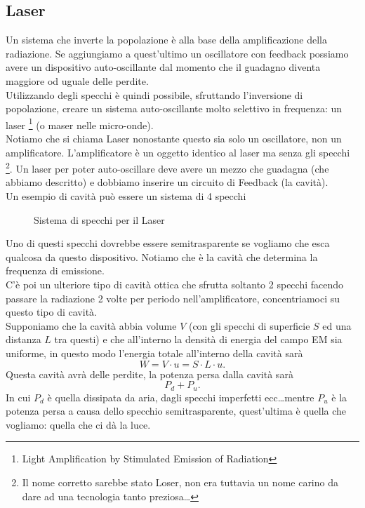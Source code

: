 \subsection{Laser}%
Un sistema che inverte la popolazione è alla base della amplificazione della radiazione. Se aggiungiamo a quest'ultimo un oscillatore con feedback possiamo avere un dispositivo auto-oscillante dal momento che il guadagno diventa maggiore od uguale delle perdite.\\
Utilizzando degli specchi è quindi possibile, sfruttando l'inversione di popolazione, creare un sistema auto-oscillante molto selettivo in frequenza: un laser
\footnote{Light Amplification by Stimulated Emission of Radiation} 
(o maser nelle micro-onde). \\ 
Notiamo che si chiama Laser nonostante questo sia solo un oscillatore, non un amplificatore. L'amplificatore è un oggetto identico al laser ma senza gli specchi
\footnote{Il nome corretto sarebbe stato Loser, non era tuttavia un nome carino da dare ad una tecnologia tanto preziosa\ldots}.
Un laser per poter auto-oscillare deve avere un mezzo che guadagna (che abbiamo descritto) e dobbiamo inserire un circuito di Feedback (la cavità).\\
Un esempio di cavità può essere un sistema di 4 specchi
\begin{figure}[H]
    \centering
    \caption{Sistema di specchi per il Laser}
    \label{fig:sistema-di-specchi-per-il-laser}
\end{figure}
\noindent
Uno di questi specchi dovrebbe essere semitrasparente se vogliamo che esca qualcosa da questo dispositivo. Notiamo che è la cavità che determina la frequenza di emissione.\\
C'è poi un ulteriore tipo di cavità ottica che sfrutta soltanto 2 specchi facendo passare la radiazione 2 volte per periodo nell'amplificatore, concentriamoci su questo tipo di cavità.\\
Supponiamo che la cavità abbia volume $V$ (con gli specchi di superficie $S$ ed una distanza $L$ tra questi)  e che all'interno la densità di energia del campo EM sia uniforme, in questo modo l'energia totale all'interno della cavità sarà
\[
W = V\cdot u = S\cdot L\cdot u
.\] 
Questa cavità avrà delle perdite, la potenza persa dalla cavità sarà
\[
P_d+P_u
.\] 
In cui $P_d$  è quella dissipata da aria, dagli specchi imperfetti ecc\ldots mentre $P_u$  è la potenza persa a causa dello specchio semitrasparente, quest'ultima è quella che vogliamo: quella che ci dà la luce.\\
